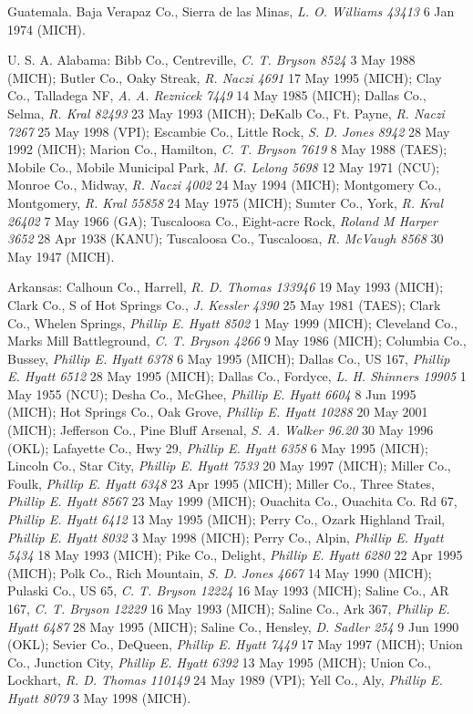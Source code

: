 \documentclass{article}
\begin{document}
Guatemala.
Baja Verapaz Co., Sierra de las Minas, \textit{L. O. Williams 43413} 
6 Jan 1974 (MICH).

U. S. A.
Alabama:
Bibb Co., Centreville, \textit{C. T. Bryson 8524} 3 May 1988 (MICH);
Butler Co., Oaky Streak, \textit{R. Naczi 4691} 17 May 1995 (MICH);
Clay Co., Talladega NF, \textit{A. A. Reznicek 7449} 14 May 1985 (MICH);
Dallas Co., Selma, \textit{R. Kral 82493} 23 May 1993 (MICH);
DeKalb Co., Ft. Payne, \textit{R. Naczi 7267} 25 May 1998 (VPI);
Escambie Co., Little Rock, \textit{S. D. Jones 8942} 28 May 1992 (MICH);
Marion Co., Hamilton, \textit{C. T. Bryson 7619} 8 May 1988 (TAES);
Mobile Co., Mobile Municipal Park, \textit{M. G. Lelong 5698} 12 May 1971 (NCU);
Monroe Co., Midway, \textit{R. Naczi 4002} 24 May 1994 (MICH);
Montgomery Co., Montgomery, \textit{R. Kral 55858} 24 May 1975 (MICH);
Sumter Co., York, \textit{R. Kral 26402} 7 May 1966 (GA);
Tuscaloosa Co., Eight-acre Rock, \textit{Roland M Harper 3652} 28 Apr 1938 (KANU);
Tuscaloosa Co., Tuscaloosa, \textit{R. McVaugh 8568} 30 May 1947 (MICH).

Arkansas:
Calhoun Co., Harrell, \textit{R. D. Thomas 133946} 19 May 1993 (MICH);
Clark Co., S of Hot Springs Co., \textit{J. Kessler 4390} 25 May 1981 (TAES);
Clark Co., Whelen Springs, \textit{Phillip E. Hyatt 8502} 1 May 1999 (MICH);
Cleveland Co., Marks Mill Battleground, \textit{C. T. Bryson 4266} 9 May 1986 (MICH);
Columbia Co., Bussey, \textit{Phillip E. Hyatt 6378} 6 May 1995 (MICH);
Dallas Co., US 167, \textit{Phillip E. Hyatt 6512} 28 May 1995 (MICH);
Dallas Co., Fordyce, \textit{L. H. Shinners 19905} 1 May 1955 (NCU);
Desha Co., McGhee, \textit{Phillip E. Hyatt 6604} 8 Jun 1995 (MICH);
Hot Springs Co., Oak Grove, \textit{Phillip E. Hyatt 10288} 20 May 2001 (MICH);
Jefferson Co., Pine Bluff Arsenal, \textit{S. A. Walker 96.20} 30 May 1996 (OKL);
Lafayette Co., Hwy 29, \textit{Phillip E. Hyatt 6358} 6 May 1995 (MICH);
Lincoln Co., Star City, \textit{Phillip E. Hyatt 7533} 20 May 1997 (MICH);
Miller Co., Foulk, \textit{Phillip E. Hyatt 6348} 23 Apr 1995 (MICH);
Miller Co., Three States, \textit{Phillip E. Hyatt 8567} 23 May 1999 (MICH);
Ouachita Co., Ouachita Co. Rd 67, \textit{Phillip E. Hyatt 6412} 13 May 1995 (MICH);
Perry Co., Ozark Highland Trail, \textit{Phillip E. Hyatt 8032} 3 May 1998 (MICH);
Perry Co., Alpin, \textit{Phillip E. Hyatt 5434} 18 May 1993 (MICH);
Pike Co., Delight, \textit{Phillip E. Hyatt 6280} 22 Apr 1995 (MICH);
Polk Co., Rich Mountain, \textit{S. D. Jones 4667} 14 May 1990 (MICH);
Pulaski Co., US 65, \textit{C. T. Bryson 12224} 16 May 1993 (MICH);
Saline Co., AR 167, \textit{C. T. Bryson 12229} 16 May 1993 (MICH);
Saline Co., Ark 367, \textit{Phillip E. Hyatt 6487} 28 May 1995 (MICH);
Saline Co., Hensley, \textit{D. Sadler 254} 9 Jun 1990 (OKL);
Sevier Co., DeQueen, \textit{Phillip E. Hyatt 7449} 17 May 1997 (MICH);
Union Co., Junction City, \textit{Phillip E. Hyatt 6392} 13 May 1995 (MICH);
Union Co., Lockhart, \textit{R. D. Thomas 110149} 24 May 1989 (VPI);
Yell Co., Aly, \textit{Phillip E. Hyatt 8079} 3 May 1998 (MICH).
\end{document}
